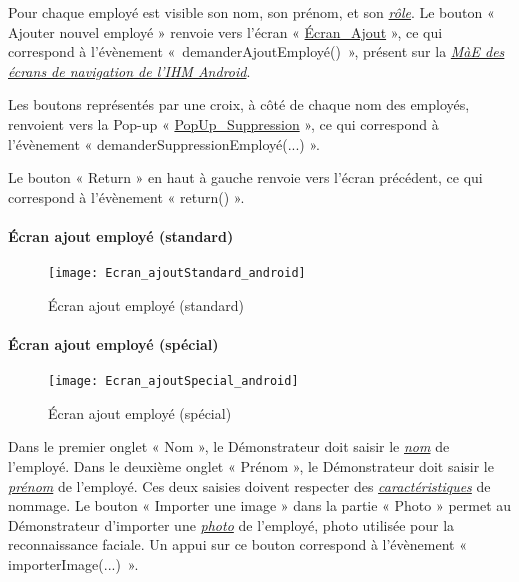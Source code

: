 Pour chaque employé est visible son nom, son prénom, et son \hyperlink{rol}{\textit{rôle}}.
Le bouton « Ajouter nouvel employé » renvoie vers l’écran « \hyperlink{EcranAjoutStandard}{Écran\_Ajout} », ce qui correspond à l'évènement «~demanderAjoutEmployé()~», présent sur la \hyperlink{MaEHome}{\textit{MàE des écrans de navigation de l'IHM Android}}.

Les boutons représentés par une croix, à côté de chaque nom des employés, renvoient vers la Pop-up « \hyperlink{popUpSuppression}{PopUp\_Suppression} », ce qui correspond à l'évènement « demanderSuppressionEmployé(...) ».

Le bouton « Return » en haut à gauche renvoie vers l’écran précédent, ce qui correspond à l'évènement « return() ». 

\paragraph{Écran ajout employé (standard)}
\hypertarget{EcranAjoutStandard}{}

\begin{figure} [H]
    \centering
    \texttt{[image: Ecran\_ajoutStandard\_android]}
    \caption{Écran ajout employé (standard)}
    \label{Écran ajout employé (standard)}
\end{figure}

\paragraph{Écran ajout employé (spécial)}
\hypertarget{EcranAjoutSpecial}{}

\begin{figure} [H]
    \centering
    \texttt{[image: Ecran\_ajoutSpecial\_android]}
    \caption{Écran ajout employé (spécial)}
    \label{Écran ajout employé (spécial)}
\end{figure}


Dans le premier onglet « Nom », le Démonstrateur doit saisir le \hyperlink{nom}{\textit{nom}} de l'employé. 
Dans le deuxième onglet « Prénom », le Démonstrateur doit saisir le \hyperlink{prénom}{\textit{prénom}} de l'employé.
Ces deux saisies doivent respecter des \hyperlink{caracEmploye}{\textit{caractéristiques}} de nommage.
Le bouton « Importer une image » dans la partie « Photo » permet au Démonstrateur d’importer une \hyperlink{photo}{\textit{photo}} de l'employé, photo utilisée pour la reconnaissance faciale.
Un appui sur ce bouton correspond à l'évènement « importerImage(...)~».

